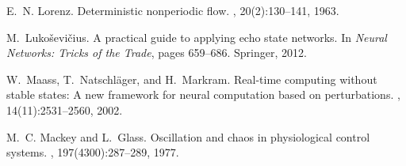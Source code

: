 \documentclass[11pt]{article}
\begin{document}
\begin{thebibliography}{10}
E.~N. Lorenz.
\newblock Deterministic nonperiodic flow.
, 20(2):130--141, 1963.

M.~Lukoševičius.
\newblock A practical guide to applying echo state networks.
\newblock In {\em Neural Networks: Tricks of the Trade}, pages 659--686. Springer, 2012.

W.~Maass, T.~Natschläger, and H.~Markram.
\newblock Real-time computing without stable states: A new framework for neural computation based on perturbations.
, 14(11):2531--2560, 2002.

M.~C. Mackey and L.~Glass.
\newblock Oscillation and chaos in physiological control systems.
, 197(4300):287--289, 1977.

\end{thebibliography}
\end{document}
